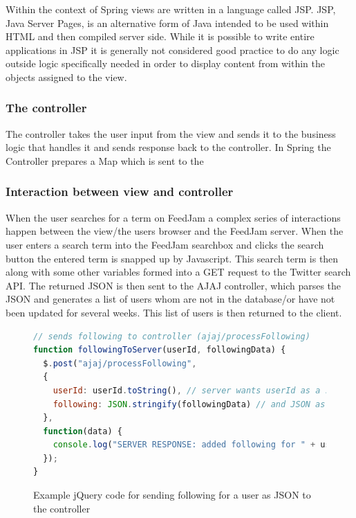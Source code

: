 Within the context of Spring views are written in a language called JSP. JSP, Java Server Pages, is an alternative form of Java intended to be used within HTML and then compiled server side. While it is possible to write entire applications in JSP it is generally not considered good practice to do any logic outside logic specifically needed in order to display content from within the objects assigned to the view.

\subsubsection{The controller}
The controller takes the user input from the view and sends it to the business logic that handles it and sends response back to the controller.
In Spring the Controller prepares a Map which is sent to the 

\subsubsection{Interaction between view and controller} %
\label{viewControllerInteraction}
When the user searches for a term on FeedJam a complex series of interactions happen between the view/the users browser and the FeedJam server. When the user enters a search term into the FeedJam searchbox and clicks the search button the entered term is snapped up by Javascript. This search term is then along with some other variables formed into a GET request to the Twitter search API. The returned JSON is then sent to the AJAJ controller, which parses the JSON and generates a list of users whom are not in the database/or have not been updated for several weeks. This list of users is then returned to the client.

\begin{figure}[h!]
\begin{lstlisting}[language=javascript]
// sends following to controller (ajaj/processFollowing)
function followingToServer(userId, followingData) {
  $.post("ajaj/processFollowing", 
  { 
    userId: userId.toString(), // server wants userId as a string
    following: JSON.stringify(followingData) // and JSON as a string
  },
  function(data) {
    console.log("SERVER RESPONSE: added following for " + userId);
  });
}
\end{lstlisting}
\caption{Example jQuery code for sending following for a user as JSON to the controller}
\label{ajaxRequest}
\end{figure}

